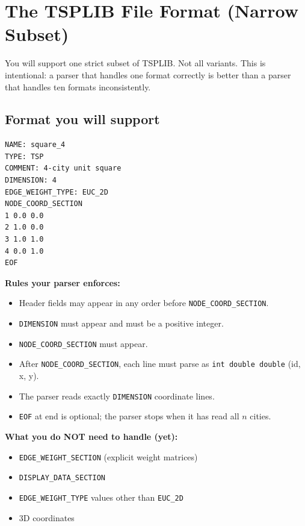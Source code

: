 \documentclass[11pt]{article}
\begin{document}
\newpage

\section{The TSPLIB File Format (Narrow Subset)}

You will support one strict subset of TSPLIB. Not all variants. This is intentional: a parser that handles one format correctly is better than a parser that handles ten formats inconsistently.

\subsection{Format you will support}

\begin{lstlisting}[style=cstyle, language={}, numbers=none]
NAME: square_4
TYPE: TSP
COMMENT: 4-city unit square
DIMENSION: 4
EDGE_WEIGHT_TYPE: EUC_2D
NODE_COORD_SECTION
1 0.0 0.0
2 1.0 0.0
3 1.0 1.0
4 0.0 1.0
EOF
\end{lstlisting}

\textbf{Rules your parser enforces:}
\begin{itemize}
  \item Header fields may appear in any order before \texttt{NODE\_COORD\_SECTION}.
  \item \texttt{DIMENSION} must appear and must be a positive integer.
  \item \texttt{NODE\_COORD\_SECTION} must appear.
  \item After \texttt{NODE\_COORD\_SECTION}, each line must parse as \texttt{int double double} (id, x, y).
  \item The parser reads exactly \texttt{DIMENSION} coordinate lines.
  \item \texttt{EOF} at end is optional; the parser stops when it has read all $n$ cities.
\end{itemize}

\textbf{What you do NOT need to handle (yet):}
\begin{itemize}
  \item \texttt{EDGE\_WEIGHT\_SECTION} (explicit weight matrices)
  \item \texttt{DISPLAY\_DATA\_SECTION}
  \item \texttt{EDGE\_WEIGHT\_TYPE} values other than \texttt{EUC\_2D}
  \item 3D coordinates
\end{itemize}
\end{document}
